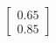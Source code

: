 \documentclass[preview]{standalone}
\begin{document}
\begin{align*}
\begin{bmatrix} 0.65 \\ 0.85 \end{bmatrix}
\end{align*}
\end{document}
